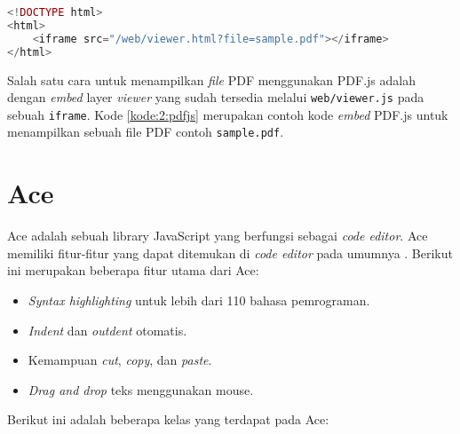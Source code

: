 \begin{lstlisting}[language=php, caption=Contoh kode untuk menggunakan PDF.js, label=kode:2:pdfjs]
<!DOCTYPE html>
<html>
    <iframe src="/web/viewer.html?file=sample.pdf"></iframe>
</html>
\end{lstlisting}

Salah satu cara untuk menampilkan \textit{file} PDF menggunakan PDF.js adalah dengan \textit{embed} layer \textit{viewer} yang sudah tersedia melalui \verb|web/viewer.js| pada sebuah \verb|iframe|. Kode \ref{kode:2:pdfjs} merupakan contoh kode \textit{embed} PDF.js untuk menampilkan sebuah file PDF contoh \verb|sample.pdf|.

\section{Ace}
\label{sec:2:ace} 
Ace adalah sebuah library JavaScript yang berfungsi sebagai \textit{code editor}.
Ace memiliki fitur-fitur yang dapat ditemukan di \textit{code editor} pada umumnya \cite{ace}. Berikut ini merupakan beberapa fitur utama dari Ace: 

\begin{itemize}
    \item \textit{Syntax highlighting} untuk lebih dari 110 bahasa pemrograman.
    \item \textit{Indent} dan \textit{outdent} otomatis.
    \item Kemampuan \textit{cut}, \textit{copy}, dan \textit{paste}.
    \item \textit{Drag and drop} teks menggunakan mouse.
\end{itemize}

Berikut ini adalah beberapa kelas yang terdapat pada Ace:

